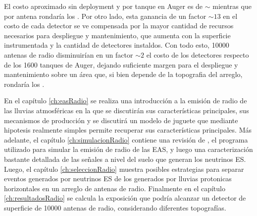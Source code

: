 El costo aproximado sin deployment y por tanque en Auger es de $\sim$ \cite{augerDesignReport} mientras que por antena rondaría los .
Por otro lado, esta ganancia de un factor $\sim13$ en el costo de cada detector se ve compensada por la mayor cantidad de recursos necesarios para despliegue y mantenimiento, que aumenta con la superficie instrumentada y la cantidad de detectores instaldos.
Con todo esto, 10000 antenas de radio disminuirían en un factor $\sim2$ el costo de los detectores respecto de los 1600 tanques de Auger, dejando suficiente margen para el despliegue y mantenimiento sobre un área que, si bien depende de la topografia del arreglo, rondaría los .

En el capítulo \ref{ch:easRadio} se realiza una introducción a la emisión de radio de las lluvias atmosféricas en la que se discutirán sus características principales, sus mecanismos de producción y se discutirá un modelo de juguete que mediante hipotesis realmente simples permite recuperar sus características principales.
Más adelante, el capítulo \ref{ch:simulacionRadio} contiene una revisión de \zhs{}, el programa utilizado para simular la emisión de radio de las EAS, y luego una caracterización bastante detallada de las señales a nivel del suelo que generan los neutrinos ES.
Luego, el capítulo \ref{ch:seleccionRadio} muestra posibles estrategias para separar eventos generados por neutrinos ES de los generados por lluvias protonicas horizontales en un arreglo de antenas de radio.
Finalmente en el capítulo \ref{ch:resultadosRadio} se calcula la exposición que podría alcanzar un detector de superficie de 10000 antenas de radio, considerando diferentes topografías.



